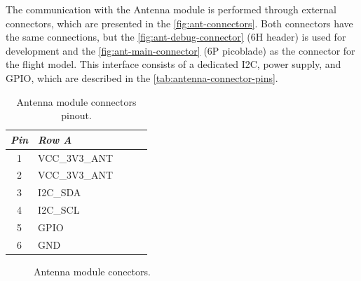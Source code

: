 The communication with the Antenna module is performed through external connectors, which are presented in the \autoref{fig:ant-connectors}. Both connectors have the same connections, but the \ref{fig:ant-debug-connector} (6H header) is used for development and the \ref{fig:ant-main-connector} (6P picoblade) as the connector for the flight model. This interface consists of a dedicated I2C, power supply, and GPIO, which are described in the \autoref{tab:antenna-connector-pins}.

\begin{table}[!h]
    \centering
    \begin{tabular}{cllll}
        \toprule[1.5pt]
        \textit{Pin} & \textit{Row A} \\
        \midrule
        1            & VCC\_3V3\_ANT  \\
        2            & VCC\_3V3\_ANT  \\
        3            & I2C\_SDA       \\
        4            & I2C\_SCL       \\
        5            & GPIO           \\
        6            & GND            \\
        \bottomrule[1.5pt]
    \end{tabular}
    \caption{Antenna module connectors pinout.}
    \label{tab:antenna-connector-pins}
\end{table}

\begin{figure}[!htb]
    \begin{center}
        \qquad
        \caption{Antenna module conectors.}
        \label{fig:ant-connectors}
    \end{center}
\end{figure}

